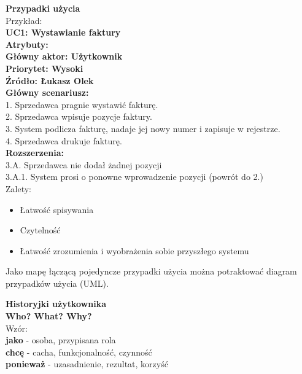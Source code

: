 \documentclass[12pt]{article}
\begin{document}
    
    \begin{definition}
    \textbf{Przypadki użycia} \\
    Przykład: \\
    
    \textbf{UC1: Wystawianie faktury} \\
    \textbf{Atrybuty:} \\
    \textbf{Główny aktor: Użytkownik} \\
    \textbf{Priorytet: Wysoki} \\
    \textbf{Źródło: Łukasz Olek} \\
    
    \textbf{Główny scenariusz:} \\
    1. Sprzedawca pragnie wystawić fakturę. \\
    2. Sprzedawca wpisuje pozycje faktury. \\
    3. System podlicza fakturę, nadaje jej nowy numer i zapisuje w rejestrze. \\
    4. Sprzedawca drukuje fakturę. \\
    \textbf{Rozszerzenia:} \\
    3.A. Sprzedawca nie dodał żadnej pozycji \\
    3.A.1. System prosi o ponowne wprowadzenie pozycji (powrót do 2.) \\
    
    Zalety:
    \begin{itemize}
        \item Łatwość spisywania
        \item Czytelność
        \item Łatwość zrozumienia i wyobrażenia sobie przyszłego systemu
    \end{itemize}
    
    Jako mapę łączącą pojedyncze przypadki użycia można potraktować diagram przypadków użycia (UML).
    \end{definition}
    
    
    \begin{definition}
    \textbf{Historyjki użytkownika} \\
    
    \textbf{Who? What? Why?} \\
    
    Wzór: \\
    
    \textbf{jako} - osoba, przypisana rola \\
    \textbf{chcę} - cacha, funkcjonalność, czynność \\
    \textbf{ponieważ} - uzasadnienie, rezultat, korzyść \\
    \end{definition}
    
\end{document}
